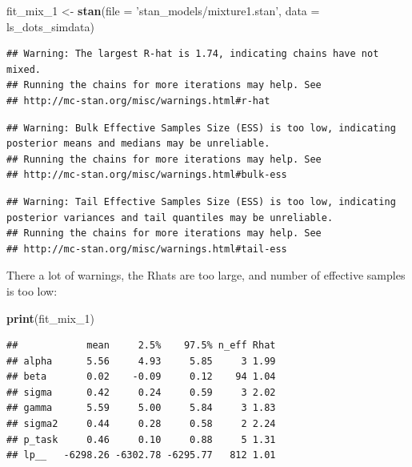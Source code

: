 \documentclass[12pt,]{krantz}
\newenvironment{Shaded}{\begin{snugshade}}{\end{snugshade}}
\newcommand{\DataTypeTok}[1]{\textcolor[rgb]{0.13,0.29,0.53}{#1}}
\newcommand{\DecValTok}[1]{\textcolor[rgb]{0.00,0.00,0.81}{#1}}
\newcommand{\KeywordTok}[1]{\textcolor[rgb]{0.13,0.29,0.53}{\textbf{#1}}}
\newcommand{\NormalTok}[1]{#1}
\newcommand{\StringTok}[1]{\textcolor[rgb]{0.31,0.60,0.02}{#1}}
\theoremstyle{definition}
\theoremstyle{definition}
\theoremstyle{definition}
\theoremstyle{remark}
\begin{document}
\begin{Shaded}
\begin{Highlighting}[]
\NormalTok{fit_mix_}\DecValTok{1}\NormalTok{ <-}\StringTok{ }\KeywordTok{stan}\NormalTok{(}\DataTypeTok{file =} \StringTok{'stan_models/mixture1.stan'}\NormalTok{,}
               \DataTypeTok{data =}\NormalTok{ ls_dots_simdata)   }
\end{Highlighting}
\end{Shaded}

\begin{verbatim}
## Warning: The largest R-hat is 1.74, indicating chains have not mixed.
## Running the chains for more iterations may help. See
## http://mc-stan.org/misc/warnings.html#r-hat
\end{verbatim}

\begin{verbatim}
## Warning: Bulk Effective Samples Size (ESS) is too low, indicating posterior means and medians may be unreliable.
## Running the chains for more iterations may help. See
## http://mc-stan.org/misc/warnings.html#bulk-ess
\end{verbatim}

\begin{verbatim}
## Warning: Tail Effective Samples Size (ESS) is too low, indicating posterior variances and tail quantiles may be unreliable.
## Running the chains for more iterations may help. See
## http://mc-stan.org/misc/warnings.html#tail-ess
\end{verbatim}

There a lot of warnings, the Rhats are too large, and number of effective samples is too low:

\begin{Shaded}
\begin{Highlighting}[]
\KeywordTok{print}\NormalTok{(fit_mix_}\DecValTok{1}\NormalTok{) }
\end{Highlighting}
\end{Shaded}

\begin{verbatim}
##            mean     2.5%    97.5% n_eff Rhat
## alpha      5.56     4.93     5.85     3 1.99
## beta       0.02    -0.09     0.12    94 1.04
## sigma      0.42     0.24     0.59     3 2.02
## gamma      5.59     5.00     5.84     3 1.83
## sigma2     0.44     0.28     0.58     2 2.24
## p_task     0.46     0.10     0.88     5 1.31
## lp__   -6298.26 -6302.78 -6295.77   812 1.01
\end{verbatim}
\end{document}

